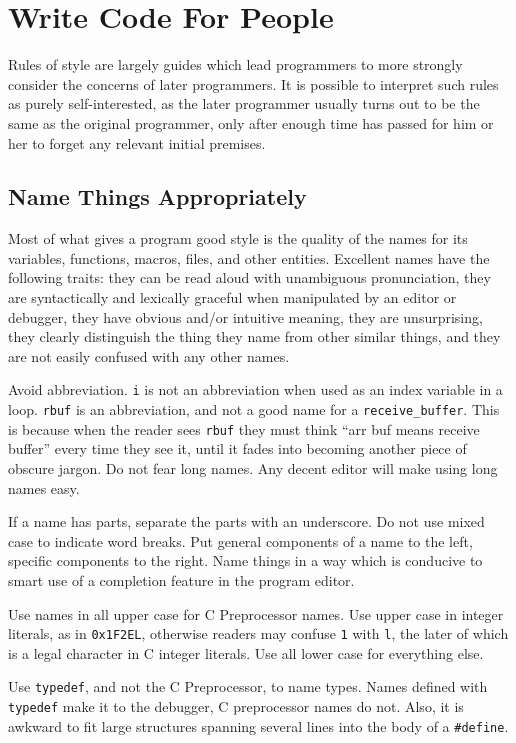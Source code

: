 \documentclass{lulu}
\newcommand{\code}[1]{\texttt{#1}\xspace}
\newcommand{\heading}[1]{\markboth{\textup{\thechapter\ -- #1}}{}}
\begin{document}
\chapter{Write Code For People}
\heading{Write Code For People}

Rules of style are largely guides which lead programmers to more
strongly consider the concerns of later programmers.  It is possible
to interpret such rules as purely self-interested, as the later
programmer usually turns out to be the same as the original
programmer, only after enough time has passed for him or her to forget
any relevant initial premises.

\section{Name Things Appropriately}

Most of what gives a program good style is the quality of the names
for its variables, functions, macros, files, and other entities.
Excellent names have the following traits: they can be read aloud with
unambiguous pronunciation, they are syntactically and lexically
graceful when manipulated by an editor or debugger, they have obvious
and/or intuitive meaning, they are unsurprising, they clearly
distinguish the thing they name from other similar things, and they
are not easily confused with any other names.

Avoid abbreviation.  \code{i} is not an abbreviation when used as an
index variable in a loop.  \code{rbuf} is an abbreviation, and not a
good name for a \code{receive\_buffer}.  This is because when the
reader sees \code{rbuf} they must think ``arr buf means receive
buffer'' every time they see it, until it fades into becoming another
piece of obscure jargon.  Do not fear long names.  Any decent editor
will make using long names easy.

If a name has parts, separate the parts with an underscore.  Do not
use mixed case to indicate word breaks.  Put general components of a
name to the left, specific components to the right.  Name things in a
way which is conducive to smart use of a completion feature in the
program editor.

Use names in all upper case for C Preprocessor names.  Use upper case
in integer literals, as in \code{0x1F2EL}, otherwise readers may
confuse \code{1} with \code{l}, the later of which is a legal
character in C integer literals.  Use all lower case for everything
else.

Use \code{typedef}, and not the C Preprocessor, to name types.  Names
defined with \code{typedef} make it to the debugger, C preprocessor
names do not.  Also, it is awkward to fit large structures spanning
several lines into the body of a \code{\#define}.
\end{document}
